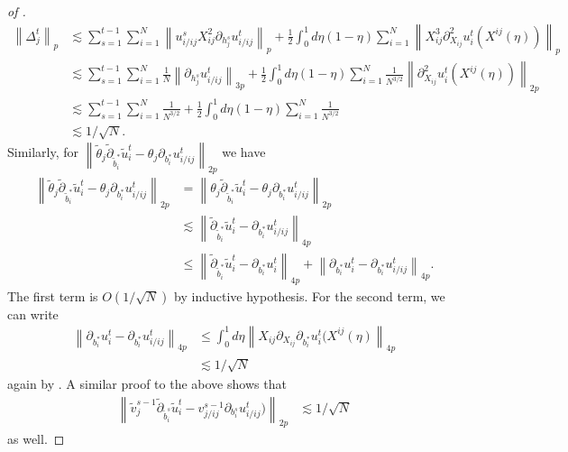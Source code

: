 \documentclass{article}
\newcommand{\1}{\mathbbm{1}}
\newcommand{\norm}[1]{\left\lVert#1\right\rVert}
\theoremstyle{plain}
\theoremstyle{definition}
\theoremstyle{remark}
\begin{document}
\begin{proof}[of ]
\begin{align*}
        \norm{\Delta_j^t}_p &\lesssim  \sum_{s=1}^{t-1} \sum_{i=1}^N \norm{u^{s}_{i/ij}X_{ij}^2\partial_{h_j^s}u_{i/ij}^{t}   }_p+ \frac{1}{2} \int_0^1 d\eta(1-\eta) \sum_{i=1}^N \norm{X_{ij}^3 \partial^2_{X_{ij}}u_i^{t}(X^{ij}(\eta))}_p \\
        &\lesssim \sum_{s=1}^{t-1} \sum_{i=1}^N \frac{1}{N}\norm{\partial_{h_j^s}u_{i/ij}^{t}   }_{3p}+ \frac{1}{2} \int_0^1 d\eta(1-\eta) \sum_{i=1}^N \frac{1}{N^{3/2}}\norm{\partial^2_{X_{ij}}u_i^{t}(X^{ij}(\eta))}_{2p} \\
         &\lesssim \sum_{s=1}^{t-1} \sum_{i=1}^N \frac{1}{N^{3/2}}+ \frac{1}{2} \int_0^1 d\eta(1-\eta) \sum_{i=1}^N \frac{1}{N^{3/2}} \\
         &\lesssim 1/\sqrt{N}.
    \end{align*}
    Similarly, for $\norm{ \tilde{\theta}_j \tilde{\partial}_{\tilde{b}_i^*} \tilde{u}_i^t - \theta_j \partial_{b_i^*}u_{i/ij}^t }_{2p}$ we have
    \begin{align*}
        \norm{ \tilde{\theta}_j \tilde{\partial}_{\tilde{b}_i^*} \tilde{u}_i^t - \theta_j \partial_{b_i^*}u_{i/ij}^t }_{2p} &= \norm{ \theta_j \tilde{\partial}_{\tilde{b}_i^*} \tilde{u}_i^t - \theta_j \partial_{b_i^*}u_{i/ij}^t }_{2p} \\
        &\lesssim \norm{  \tilde{\partial}_{\tilde{b}_i^*} \tilde{u}_i^t - \partial_{b_i^*}u_{i/ij}^t }_{4p} \\
        &\leq \norm{  \tilde{\partial}_{\tilde{b}_i^*} \tilde{u}_i^t - \partial_{b_i^*}u_{i}^t }_{4p} + \norm{\partial_{b_i^*}u_{i}^t - \partial_{b_i^*}u_{i/ij}^t}_{4p}.
    \end{align*}
    The first term is $O( 1/\sqrt{N})$ by inductive hypothesis. For the second term, we can write 
    \begin{align}
        \norm{\partial_{b_i^*}u_{i}^t - \partial_{b_i^*}u_{i/ij}^t}_{4p} &\leq \int_0^1d\eta \norm{X_{ij} \partial_{X_{ij}}\partial_{b_i^*}u_{i}^t(X^{ij}(\eta)}_{4p}\label{eq:taylor-expansion-to-put-xij-back} \\
        &\lesssim 1/\sqrt{N}\nonumber
    \end{align}
    again by . A similar proof to the above shows that 
    \begin{align*}
        \norm{\tilde{v}_j^{s-1} \tilde{\partial}_{\tilde{b}_i^s} \tilde{u}_i^t - v_{j/ij}^{s-1} \partial_{b_i^s}u_{i/ij}^t )}_{2p} &\lesssim 1/\sqrt{N}
    \end{align*}
    as well.


\end{proof}
\end{document}
